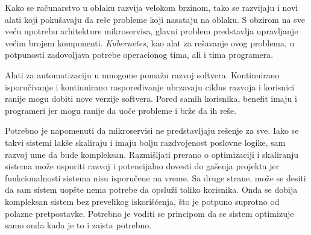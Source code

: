 Kako se računarstvo u oblaku razvija velokom brzinom, tako se razvijaju i novi alati 
koji pokušavaju da reše probleme koji nasataju na oblaku. S obzirom na sve veću upotrebu 
arhitekture mikroservisa, glavni problem predstavlja upravljanje većim brojem komponenti.
\textit{Kubernetes}, kao alat za rešavanje ovog problema, u potpunosti zadovoljava 
potrebe operacionog tima, ali i tima programera.

Alati za automatizaciju u mnogome pomažu razvoj softvera. Kontinuirano isporučivanje 
i kontinuirano raspoređivanje ubrzavaju ciklus razvoja i korisnici ranije mogu dobiti 
nove verzije softvera. Pored samih korisnika, benefit imaju i programeri jer mogu 
ranije da uoče probleme i brže da ih reše.

Potrebno je napomenuti da mikroservisi ne predstavljaju rešenje za sve. Iako se takvi 
sistemi lakše skaliraju i imaju bolju razdvojenost poslovne logike, sam razvoj ume da 
bude kompleksan. Razmišljati prerano o optimizaciji i skaliranju sistema može usporiti 
razvoj i potencijalno dovesti do gašenja projekta jer funkcionalnosti sistema nisu 
isporučene na vreme. Sa druge strane, može se desiti da sam sistem uopšte nema potrebe 
da opsluži toliko korisnika. Onda se dobija kompleksan sistem bez prevelikog iskorišćenja,
što je potpuno suprotno od polazne pretpostavke. Potrebno je voditi se principom da se 
sistem optimizuje samo onda kada je to i zaista potrebno.
